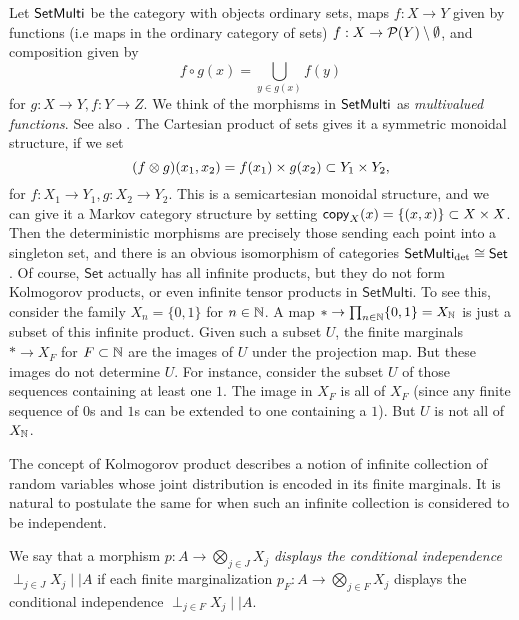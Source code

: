 \documentclass[11pt]{article}
\renewcommand{\sf}{\mathsf}
\begin{document}
\begin{example}
    \label{setmulti}
    Let $\operatorname{\mathsf{SetMulti}}$ be the category with objects ordinary sets, maps $f: X \to Y$ given by functions (i.e maps in the ordinary category of sets) $f: X \to \mathcal{P}(Y)\setminus \emptyset$, and composition given by
    \[f\circ g(x) = \bigcup_{y \in g(x)} f(y)\]
    for $g: X \to Y, f: Y \to Z$.
    We think of the morphisms in $\operatorname{\mathsf{SetMulti}}$ as \emph{multivalued functions}.
    See also \cite[Example~2.6]{markov_cats}.
    The Cartesian product of sets gives it a symmetric monoidal structure, if we set \[(f \otimes g)(x_1,x_2) = f(x_1) \times g(x_2) \subset Y_1 \times Y_2,\] for $f:X_1 \to Y_1, g: X_2 \to Y_2$.
    This is a semicartesian monoidal structure, and we can give it a Markov category structure by setting
    $\mathsf{copy}_{X}(x) = \{(x,x)\} \subset X \times X$.
    Then the deterministic morphisms are precisely those sending each point into a singleton set, and there is an obvious isomorphism of categories
    $\SetMulti_\detc \cong \sf{Set}$.
    Of course, $\sf{Set}$ actually has all infinite products, but they do not form Kolmogorov products, or even infinite tensor products in $\sf{SetMulti}$.
    To see this, consider the family $X_n = \{0,1\}$ for $n \in \mathbb{N}$.
    A map $* \to \prod_{n\in \mathbb{N}} \{0,1\} = X_{\mathbb{N}}$ is just a subset of this infinite product.
    Given such a subset $U$, the finite marginals $* \to X_F$ for $F \subset \mathbb{N}$ are the images of $U$ under the projection map.
    But these images do not determine $U$. For instance, consider the subset $U$ of those sequences containing at least one $1$.
    The image in $X_F$ is all of $X_F$ (since any finite sequence of $0$s and $1$s can be extended to one containing a $1$).
    But $U$ is not all of $X_{\mathbb{N}}$.

\end{example}

The concept of Kolmogorov product describes a notion of infinite collection of random variables whose joint distribution is encoded in its finite marginals. It is natural to postulate the same for when such an infinite collection is considered to be independent.

\begin{definition}
	We say that a morphism $p : A \to \bigotimes_{j \in J} X_j$ \emph{displays the conditional independence} $\perp_{j \in J}  X_j \mid\mid A$ if each finite marginalization $p_F : A \to \bigotimes_{j \in F} X_j$ displays the conditional independence $\perp_{j \in F} X_j \mid\mid A$.
\end{definition}
\end{document}
